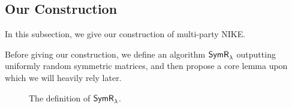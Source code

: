 \subsection{Our Construction}
\label{sec:ncnike-con}
In this subsection, we give our construction of multi-party NIKE.

 Before giving our construction, we define an algorithm ${\mathsf{SymR}}_\lambda$ outputting uniformly random symmetric matrices, and then propose a core lemma upon which we will heavily rely later. %
\begin{figure}[htpb]
\begin{center}
\end{center} 
\caption{The definition of ${\mathsf{SymR}}_\lambda$.} 
\label{fig:hatsamp}
\end{figure}



